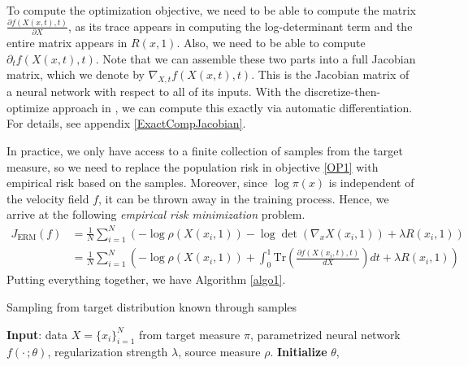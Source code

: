 To compute the optimization objective, we need to be able to compute the matrix $\frac{\partial f(X(x,t),t)}{\partial X}$, as its trace appears in computing the log-determinant term and the entire matrix appears in $R(x,1)$. Also, we need to be able to compute $\partial_tf(X(x,t),t)$. Note that we can assemble these two parts into a full Jacobian matrix, which we denote by $\nabla_{X,t}f(X(x,t),t)$. This is the Jacobian matrix of a neural network with respect to all of its inputs. With the discretize-then-optimize approach in \cite{OTFlow}, we can compute this exactly via automatic differentiation. For details, see appendix \ref{ExactCompJacobian}.

In practice, we only have access to a finite collection of samples from the target measure, so we need to replace the population risk in objective \ref{OP1} with empirical risk based on the samples. Moreover, since $\log\pi(x)$ is independent of the velocity field $f$, it can be thrown away in the training process. Hence, we arrive at the following \textit{empirical risk minimization} problem. 
\begin{equation}\label{ERM}
\begin{aligned}
     J_\text{ERM}(f) &= \frac{1}{N}\sum_{i=1}^N\left( -\log\rho(X(x_i,1)) - \log\det(\nabla_x X(x_i,1)) + \lambda R(x_i,1)\right)\\
     &=  \frac{1}{N}\sum_{i=1}^N\left( -\log\rho(X(x_i,1)) + \int_0^1\text{Tr}\left(\frac{\partial f(X(x_i,t),t)}{dX}\right)dt + \lambda R(x_i,1)\right)
\end{aligned}\tag{ERM}
\end{equation}
Putting everything together, we have Algorithm \ref{algo1}. 

 \begin{algorithm}
 \caption{Sampling from target distribution known through samples}
 \label{algo1}
 \begin{algorithmic}[1]
 \STATE \textbf{Input}: data $X = \{ x_i\}_{i=1}^N$ from target measure $\pi$, parametrized neural network $f(\cdot\,; \theta)$, regularization strength $\lambda$, source measure $\rho$.
 \STATE\textbf{Initialize} $\theta$,
 \ENDWHILE
 \end{algorithmic}
 \end{algorithm}

